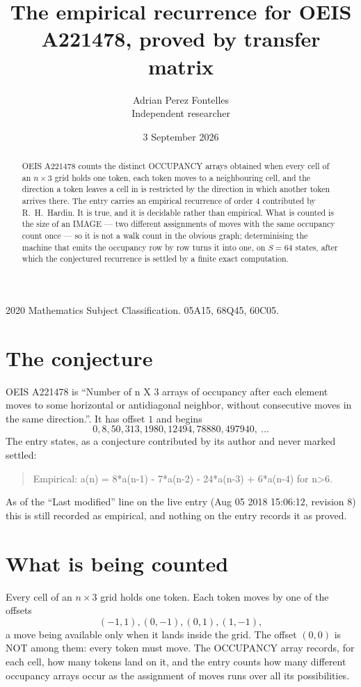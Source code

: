 \documentclass[11pt,a4paper]{article}
\title{The empirical recurrence for OEIS A221478, proved by transfer matrix}
\author{Adrian Perez Fontelles\\ \small Independent researcher}
\date{3 September 2026}
\theoremstyle{plain}
\theoremstyle{definition}
\begin{document}
\maketitle

\begin{abstract}
OEIS A221478 counts the distinct OCCUPANCY arrays obtained when every cell of an $n\times3$ grid
holds one token, each token moves to a neighbouring cell, and the direction a token leaves a
cell in is restricted by the direction in which another token arrives there. The entry carries
an empirical recurrence of order $4$ contributed by R.~H.~Hardin. It is true, and it is
decidable rather than empirical. What is counted is the size of an IMAGE --- two different
assignments of moves with the same occupancy count once --- so it is not a walk count in the
obvious graph; determinising the machine that emits the occupancy row by row turns it into
one, on $S=64$ states, after which the conjectured recurrence is settled by a finite exact
computation.
\end{abstract}

\noindent\small 2020 Mathematics Subject Classification. 05A15, 68Q45, 60C05.\normalsize

\section{The conjecture}

OEIS A221478 is ``Number of n X 3 arrays of occupancy after each element moves to some horizontal or antidiagonal neighbor, without consecutive moves in the same direction.''. It has offset $1$ and begins
\[
0, 8, 50, 313, 1980, 12494, 78880, 497940,\ \dots
\]
The entry states, as a conjecture contributed by its author and never marked settled:
\begin{quote}
Empirical: a(n) = 8*a(n-1) - 7*a(n-2) - 24*a(n-3) + 6*a(n-4) for n>6.
\end{quote}
As of the ``Last modified'' line on the live entry (Aug 05 2018 15:06:12, revision 8) this is still
recorded as empirical, and nothing on the entry records it as proved.

\section{What is being counted}

Every cell of an $n\times3$ grid holds one token. Each token moves by one of the offsets
\[
(-1,1), (0,-1), (0,1), (1,-1),
\]
a move being available only when it lands inside the grid. The offset $(0,0)$ is NOT among them: every token must move. The OCCUPANCY array
records, for each cell, how many tokens land on it, and the entry counts how many different
occupancy arrays occur as the assignment of moves runs over all its possibilities.
\end{document}

